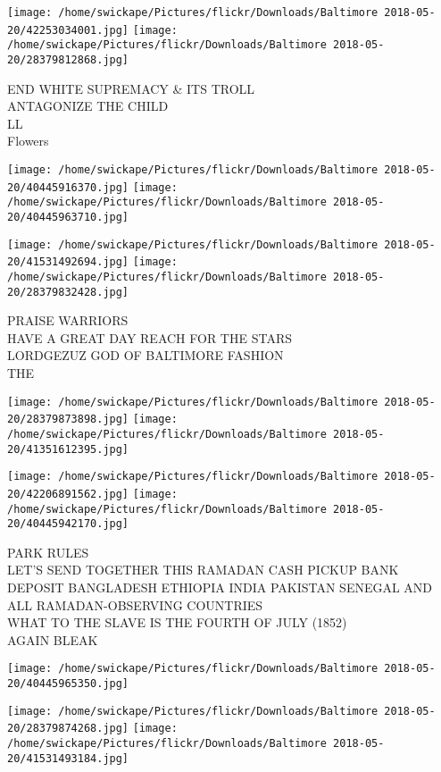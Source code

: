 \documentclass[10pt,letterpaper]{article}
\begin{document}
\texttt{[image: /home/swickape/Pictures/flickr/Downloads/Baltimore 2018-05-20/42253034001.jpg]}
\texttt{[image: /home/swickape/Pictures/flickr/Downloads/Baltimore 2018-05-20/28379812868.jpg]}

END WHITE SUPREMACY \& ITS TROLL\\
ANTAGONIZE THE CHILD\\
LL\\
Flowers\\
\pagebreak

\texttt{[image: /home/swickape/Pictures/flickr/Downloads/Baltimore 2018-05-20/40445916370.jpg]}
\texttt{[image: /home/swickape/Pictures/flickr/Downloads/Baltimore 2018-05-20/40445963710.jpg]}

\texttt{[image: /home/swickape/Pictures/flickr/Downloads/Baltimore 2018-05-20/41531492694.jpg]}
\texttt{[image: /home/swickape/Pictures/flickr/Downloads/Baltimore 2018-05-20/28379832428.jpg]}

PRAISE WARRIORS\\
HAVE A GREAT DAY REACH FOR THE STARS\\
LORDGEZUZ GOD OF BALTIMORE FASHION\\
THE\\
\pagebreak

\texttt{[image: /home/swickape/Pictures/flickr/Downloads/Baltimore 2018-05-20/28379873898.jpg]}
\texttt{[image: /home/swickape/Pictures/flickr/Downloads/Baltimore 2018-05-20/41351612395.jpg]}

\texttt{[image: /home/swickape/Pictures/flickr/Downloads/Baltimore 2018-05-20/42206891562.jpg]}
\texttt{[image: /home/swickape/Pictures/flickr/Downloads/Baltimore 2018-05-20/40445942170.jpg]}

PARK RULES\\
LET'S SEND TOGETHER THIS RAMADAN CASH PICKUP BANK DEPOSIT BANGLADESH ETHIOPIA INDIA PAKISTAN SENEGAL AND ALL RAMADAN{-}OBSERVING COUNTRIES\\
WHAT TO THE SLAVE IS THE FOURTH OF JULY (1852)\\
AGAIN BLEAK\\
\pagebreak

\texttt{[image: /home/swickape/Pictures/flickr/Downloads/Baltimore 2018-05-20/40445965350.jpg]}

\vspace{0.25in}
\texttt{[image: /home/swickape/Pictures/flickr/Downloads/Baltimore 2018-05-20/28379874268.jpg]}
\texttt{[image: /home/swickape/Pictures/flickr/Downloads/Baltimore 2018-05-20/41531493184.jpg]}
\end{document}
